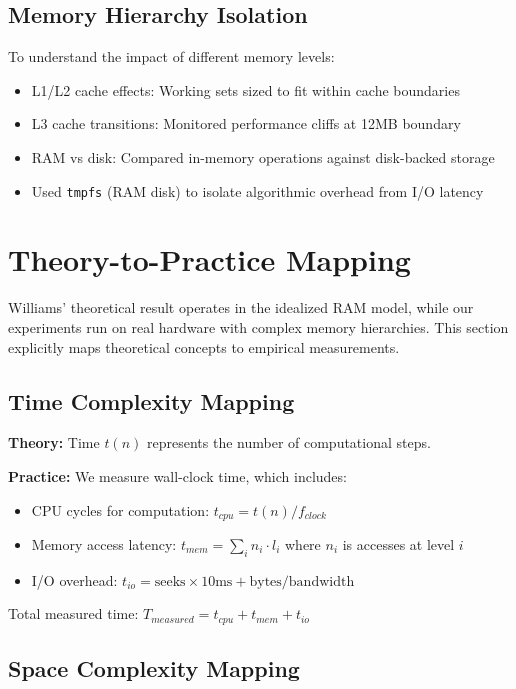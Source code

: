 \documentclass[11pt]{article}
\theoremstyle{definition}
\begin{document}
\subsection{Memory Hierarchy Isolation}

To understand the impact of different memory levels:
\begin{itemize}
\item L1/L2 cache effects: Working sets sized to fit within cache boundaries
\item L3 cache transitions: Monitored performance cliffs at 12MB boundary
\item RAM vs disk: Compared in-memory operations against disk-backed storage
\item Used \texttt{tmpfs} (RAM disk) to isolate algorithmic overhead from I/O latency
\end{itemize}

\section{Theory-to-Practice Mapping}
\label{sec:theory-practice}

Williams' theoretical result operates in the idealized RAM model, while our experiments run on real hardware with complex memory hierarchies. This section explicitly maps theoretical concepts to empirical measurements.

\subsection{Time Complexity Mapping}

\textbf{Theory:} Time $t(n)$ represents the number of computational steps.

\textbf{Practice:} We measure wall-clock time, which includes:
\begin{itemize}
\item CPU cycles for computation: $t_{cpu} = t(n) / f_{clock}$
\item Memory access latency: $t_{mem} = \sum_{i} n_i \cdot l_i$ where $n_i$ is accesses at level $i$
\item I/O overhead: $t_{io} = \text{seeks} \times 10\text{ms} + \text{bytes} / \text{bandwidth}$
\end{itemize}

Total measured time: $T_{measured} = t_{cpu} + t_{mem} + t_{io}$

\subsection{Space Complexity Mapping}
\end{document}
